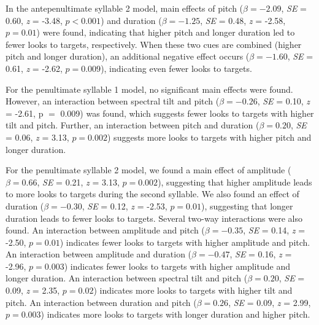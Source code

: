 In the antepenultimate syllable 2 model, main effects of pitch ($\beta= -2.09$, \textit{SE} = 0.60, \textit{z} = -3.48, $p < 0.001$) and duration ($\beta= -1.25$, \textit{SE} = 0.48, \textit{z} = -2.58, $p = 0.01$) were found, indicating that higher pitch and longer duration led to fewer looks to targets, respectively. When these two cues are combined (higher pitch and longer duration), an additional negative effect occurs ($\beta= -1.60$, \textit{SE} = 0.61, \textit{z} = -2.62, $p = 0.009$), indicating even fewer looks to targets.

For the penultimate syllable 1 model, no significant main effects were found. However, an interaction between spectral tilt and pitch ($\beta= -0.26$, \textit{SE} = 0.10, \textit{z} = -2.61, p $=$ 0.009) was found, which suggests fewer looks to targets with higher tilt and pitch. Further, an interaction between pitch and duration ($\beta= 0.20$, \textit{SE} = 0.06, \textit{z} = 3.13, $p = 0.002$) suggests more looks to targets with higher pitch and longer duration.

For the penultimate syllable 2 model, we found a main effect of amplitude ($\beta= 0.66$, \textit{SE} = 0.21, \textit{z} = 3.13, $p = 0.002$), suggesting that higher amplitude leads to more looks to targets during the second syllable. We also found an effect of duration ($\beta= -0.30$, \textit{SE} = 0.12, \textit{z} = -2.53, $p = 0.01$), suggesting that longer duration leads to fewer looks to targets. Several two-way interactions were also found. An interaction between amplitude and pitch ($\beta= -0.35$, \textit{SE} = 0.14, \textit{z} = -2.50, $p = 0.01$) indicates fewer looks to targets with higher amplitude and pitch. An interaction between amplitude and duration ($\beta= -0.47$, \textit{SE} = 0.16, \textit{z} = -2.96, $p = 0.003$) indicates fewer looks to targets with higher amplitude and longer duration. An interaction between spectral tilt and pitch ($\beta= 0.20$, \textit{SE} = 0.09, \textit{z} = 2.35, $p = 0.02$) indicates more looks to targets with higher tilt and pitch. An interaction between duration and pitch ($\beta= 0.26$, \textit{SE} = 0.09, \textit{z} = 2.99, $p = 0.003$) indicates more looks to targets with longer duration and higher pitch. 



